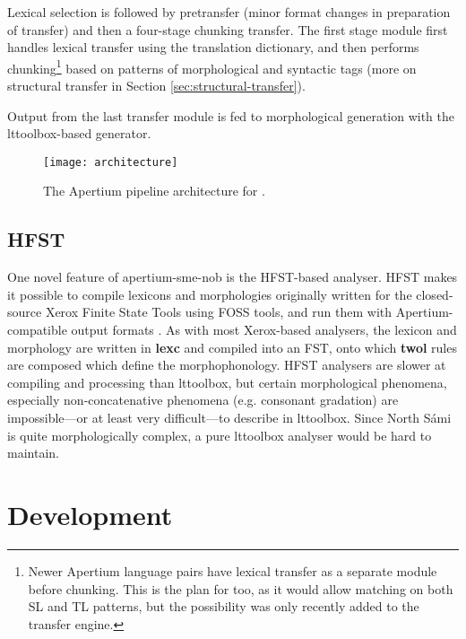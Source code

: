 \documentclass{book}
\begin{document}
Lexical selection is followed by pretransfer (minor format changes in
preparation of transfer) and then a four-stage chunking transfer. The
first stage module first handles lexical transfer using the
translation dictionary, and then performs chunking\footnote{Newer
  Apertium language pairs have lexical transfer as a separate module
  before chunking. This is the plan for \smenob{} too, as it would
  allow matching on both SL and TL patterns, but the possibility was
  only recently added to the transfer engine.} based on patterns of
morphological and syntactic tags (more on structural transfer in
Section \ref{sec:structural-transfer}).

Output from the last transfer module is fed to morphological
generation with the lttoolbox-based \nob{} generator.

\begin{figure*}[htbp]
\begin{center}
 \texttt{[image: architecture]}
\end{center}
\caption{The Apertium pipeline architecture for \smenob.}
\label{fig:modules}
\end{figure*}


\subsection{HFST}
\label{sec:hfst}
One novel feature of apertium-sme-nob is the HFST-based analyser. HFST
makes it possible to compile lexicons and morphologies originally
written for the closed-source Xerox Finite State Tools using FOSS
tools, and run them with Apertium-compatible output formats
\citep{pirinen2011compiling}. As with most Xerox-based analysers, the
\sme{} lexicon and morphology are written in \textbf{lexc} and
compiled into an FST, onto which \textbf{twol} rules are composed
which define the morphophonology. HFST analysers are slower at
compiling and processing than lttoolbox, but certain morphological
phenomena, especially non-concatenative phenomena (e.g. \sme{}
consonant gradation) are impossible---or at least very difficult---to
describe in lttoolbox. Since North S\'{a}mi is quite morphologically
complex, a pure lttoolbox analyser would be hard to maintain.


\section{Development}
  \label{sec:development}
\end{document}
